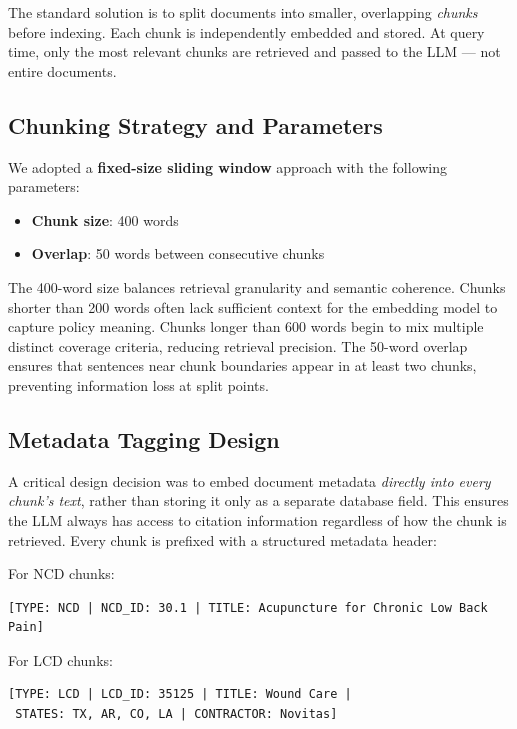 \documentclass[10pt, letterpaper]{article}
\begin{document}
The standard solution is to split documents into smaller, overlapping \textit{chunks}
before indexing. Each chunk is independently embedded and stored. At query time, only
the most relevant chunks are retrieved and passed to the LLM --- not entire documents.
 
\subsection{Chunking Strategy and Parameters}
 
We adopted a \textbf{fixed-size sliding window} approach with the following parameters:
 
\begin{itemize}[noitemsep, topsep=4pt]
    \item \textbf{Chunk size}: 400 words
    \item \textbf{Overlap}: 50 words between consecutive chunks
\end{itemize}
 
The 400-word size balances retrieval granularity and semantic coherence. Chunks shorter
than 200 words often lack sufficient context for the embedding model to capture policy
meaning. Chunks longer than 600 words begin to mix multiple distinct coverage criteria,
reducing retrieval precision. The 50-word overlap ensures that sentences near chunk
boundaries appear in at least two chunks, preventing information loss at split points.
 
\subsection{Metadata Tagging Design}
 
A critical design decision was to embed document metadata \textit{directly into every
chunk's text}, rather than storing it only as a separate database field. This ensures
the LLM always has access to citation information regardless of how the chunk is
retrieved. Every chunk is prefixed with a structured metadata header:
 
For NCD chunks:
\begin{verbatim}
[TYPE: NCD | NCD_ID: 30.1 | TITLE: Acupuncture for Chronic Low Back Pain]
\end{verbatim}
 
For LCD chunks:
\begin{verbatim}
[TYPE: LCD | LCD_ID: 35125 | TITLE: Wound Care |
 STATES: TX, AR, CO, LA | CONTRACTOR: Novitas]
\end{verbatim}
 
\end{document}
